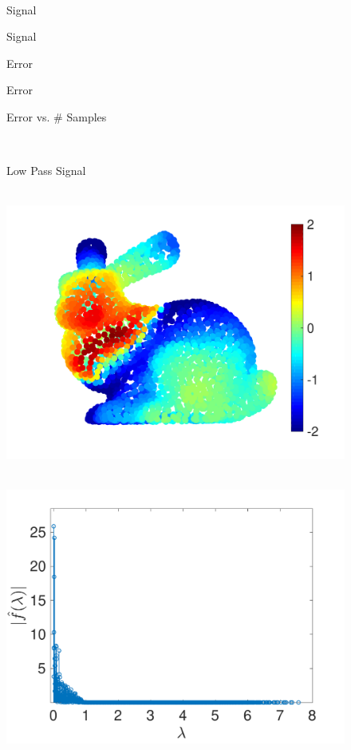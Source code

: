 \documentclass[a4paper]{article}
\theoremstyle{definition}
\begin{document}
\begin{figure}[bth] 
\begin{minipage}[m]{0.16\linewidth}
~
\end{minipage}
\begin{minipage}[m]{0.16\linewidth}
\centerline{\small{Signal}}
\end{minipage}
\hspace{.01\linewidth}
\begin{minipage}[m]{0.16\linewidth}
\centerline{\small{Signal~~~~}}
\end{minipage}
\begin{minipage}[m]{0.16\linewidth}
\centerline{\small{Error~~~~}}\end{minipage}
\begin{minipage}[m]{0.16\linewidth}
\centerline{\small{Error~~~~}}\end{minipage}
\begin{minipage}[m]{0.16\linewidth}
\centerline{\small{Error vs. \# Samples~~~~~}}\end{minipage} \\
\begin{minipage}[m]{0.16\linewidth}
\centerline{\small{Low Pass Signal}}
\end{minipage}
\begin{minipage}[m]{0.16\linewidth}
\centerline{~~\includegraphics[width=.85\linewidth]{fig_low_pass_signal_bunny}}
\end{minipage}
\begin{minipage}[m]{0.16\linewidth}
\centerline{~~\includegraphics[width=.85\linewidth]{fig_low_pass_signal_spectral_bunny}}

\end{minipage}
\end{figure}
\end{document}
